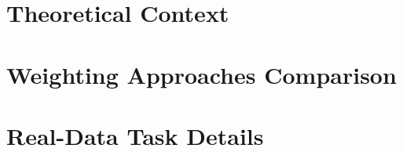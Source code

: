 \documentclass[twoside]{article}
\begin{document}
\section{Theoretical Context}
\label{app:theory}


\section{Weighting Approaches Comparison}
\label{app:weighting-comparison}


\section{Real-Data Task Details}



\end{document}
